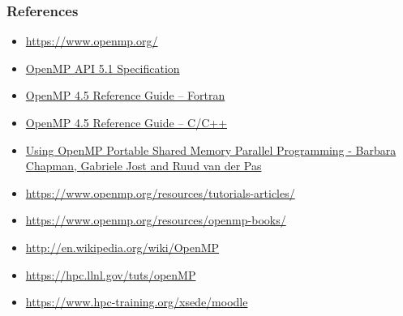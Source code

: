 \documentclass[10pt,t]{beamer}
\begin{document}
\begin{frame}
  \frametitle{References}
  \begin{itemize}
    \item \url{https://www.openmp.org/}
    \item \href{https://www.openmp.org/spec-html/5.1/openmp.html}{OpenMP API 5.1 Specification}
    \item \href{https://www.openmp.org/wp-content/uploads/OpenMP-4.5-1115-F-web.pdf}{OpenMP 4.5 Reference Guide – Fortran}
    \item \href{https://www.openmp.org/wp-content/uploads/OpenMP-4.5-1115-CPP-web.pdf}{OpenMP 4.5 Reference Guide – C/C++ }
    \item \href{https://mitpress.mit.edu/books/using-openmp}{Using OpenMP Portable Shared Memory Parallel Programming - Barbara Chapman, Gabriele Jost and Ruud van der Pas}
    \item \url{https://www.openmp.org/resources/tutorials-articles/}
    \item \url{https://www.openmp.org/resources/openmp-books/}
    \item \url{http://en.wikipedia.org/wiki/OpenMP}
    \item \url{https://hpc.llnl.gov/tuts/openMP}
    \item \url{https://www.hpc-training.org/xsede/moodle}
  \end{itemize}
\end{frame}
\end{document}

